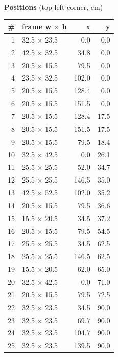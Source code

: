 \documentclass[a4paper,landscape,10pt]{article}
\begin{document}
\begin{minipage}[t]{0.25\textwidth}
\vspace{8pt}
{\bfseries Positions} (top-left corner, cm)\\[2pt]
\tiny
\begin{tabular}{@{}r l r r@{}}
\toprule
\# & frame w $\times$ h & x & y \\
\midrule
1 & 32.5 $\times$ 23.5 & 0.0 & 0.0 \\
2 & 42.5 $\times$ 32.5 & 34.8 & 0.0 \\
3 & 20.5 $\times$ 15.5 & 79.5 & 0.0 \\
4 & 23.5 $\times$ 32.5 & 102.0 & 0.0 \\
5 & 20.5 $\times$ 15.5 & 128.4 & 0.0 \\
6 & 20.5 $\times$ 15.5 & 151.5 & 0.0 \\
7 & 20.5 $\times$ 15.5 & 128.4 & 17.5 \\
8 & 20.5 $\times$ 15.5 & 151.5 & 17.5 \\
9 & 20.5 $\times$ 15.5 & 79.5 & 18.4 \\
10 & 32.5 $\times$ 42.5 & 0.0 & 26.1 \\
11 & 25.5 $\times$ 25.5 & 52.0 & 34.7 \\
12 & 25.5 $\times$ 25.5 & 146.5 & 35.0 \\
13 & 42.5 $\times$ 52.5 & 102.0 & 35.2 \\
14 & 20.5 $\times$ 15.5 & 79.5 & 36.6 \\
15 & 15.5 $\times$ 20.5 & 34.5 & 37.2 \\
16 & 20.5 $\times$ 15.5 & 79.5 & 54.5 \\
17 & 25.5 $\times$ 25.5 & 34.5 & 62.5 \\
18 & 25.5 $\times$ 25.5 & 146.5 & 62.5 \\
19 & 15.5 $\times$ 20.5 & 62.0 & 65.0 \\
20 & 32.5 $\times$ 42.5 & 0.0 & 71.0 \\
21 & 20.5 $\times$ 15.5 & 79.5 & 72.5 \\
22 & 32.5 $\times$ 23.5 & 34.5 & 90.0 \\
23 & 32.5 $\times$ 23.5 & 69.7 & 90.0 \\
24 & 32.5 $\times$ 23.5 & 104.7 & 90.0 \\
25 & 32.5 $\times$ 23.5 & 139.5 & 90.0 \\
\bottomrule
\end{tabular}
\end{minipage}
\clearpage
\end{document}
